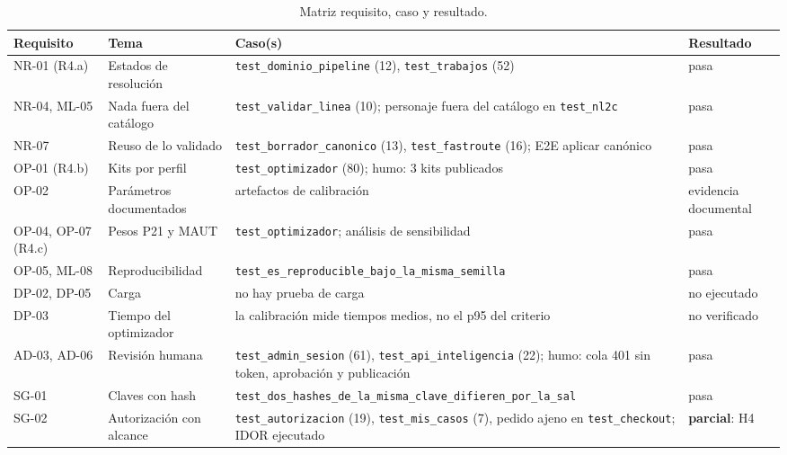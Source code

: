 \documentclass[11pt,letterpaper]{article}
\newcommand{\ruta}[1]{\texttt{\small #1}}
\begin{document}
\begin{longtable}{L{2.2cm}L{3.6cm}L{6.3cm}L{2.6cm}}
\caption{Matriz requisito, caso y resultado.}\\
\toprule
Requisito & Tema & Caso(s) & Resultado \\
\midrule\endhead
NR-01 (R4.a) & Estados de resolución & \ruta{test\_\allowbreak{}dominio\_\allowbreak{}pipeline} (12), \ruta{test\_\allowbreak{}trabajos} (52) & pasa \\
NR-04, ML-05 & Nada fuera del catálogo & \ruta{test\_\allowbreak{}validar\_\allowbreak{}linea} (10); personaje fuera del catálogo en
\ruta{test\_\allowbreak{}nl2c} & pasa \\
NR-07 & Reuso de lo validado & \ruta{test\_\allowbreak{}borrador\_\allowbreak{}canonico} (13), \ruta{test\_\allowbreak{}fastroute} (16); E2E
aplicar canónico & pasa \\
OP-01 (R4.b) & Kits por perfil & \ruta{test\_\allowbreak{}optimizador} (80); humo: 3 kits publicados & pasa \\
OP-02 & Parámetros documentados & artefactos de calibración & evidencia documental \\
OP-04, OP-07 (R4.c) & Pesos P21 y MAUT & \ruta{test\_\allowbreak{}optimizador}; análisis de sensibilidad & pasa \\
OP-05, ML-08 & Reproducibilidad & \ruta{test\_\allowbreak{}es\_\allowbreak{}reproducible\_\allowbreak{}bajo\_\allowbreak{}la\_\allowbreak{}misma\_\allowbreak{}semilla} & pasa \\
DP-02, DP-05 & Carga & no hay prueba de carga & no ejecutado \\
DP-03 & Tiempo del optimizador & la calibración mide tiempos medios, no el p95 del criterio & no verificado \\
AD-03, AD-06 & Revisión humana & \ruta{test\_\allowbreak{}admin\_\allowbreak{}sesion} (61), \ruta{test\_\allowbreak{}api\_\allowbreak{}inteligencia} (22); humo:
cola 401 sin token, aprobación y publicación & pasa \\
SG-01 & Claves con hash & \ruta{test\_\allowbreak{}dos\_\allowbreak{}hashes\_\allowbreak{}de\_\allowbreak{}la\_\allowbreak{}misma\_\allowbreak{}clave\_\allowbreak{}difieren\_\allowbreak{}por\_\allowbreak{}la\_\allowbreak{}sal} & pasa \\
SG-02 & Autorización con alcance & \ruta{test\_\allowbreak{}autorizacion} (19), \ruta{test\_\allowbreak{}mis\_\allowbreak{}casos} (7), pedido ajeno
en \ruta{test\_\allowbreak{}checkout}; IDOR ejecutado & \textbf{parcial}: H4 \\

\end{longtable}
\end{document}
